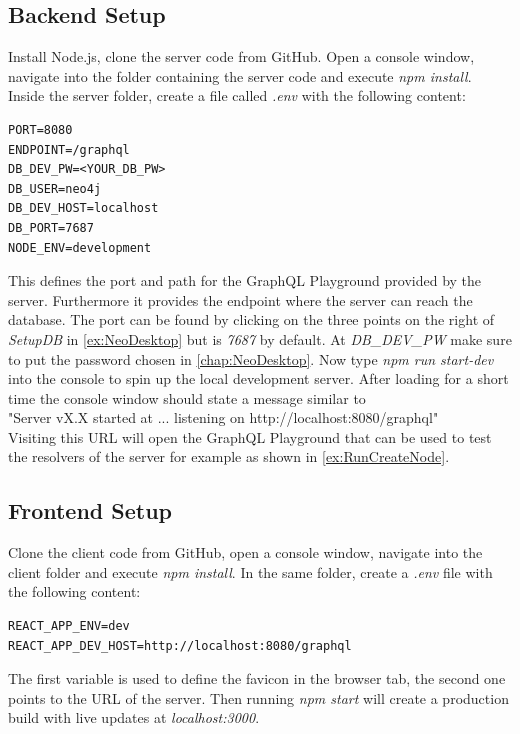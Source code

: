 \subsection{Backend Setup}
Install Node.js, clone the server \cite{GitServer} code from GitHub. Open a console window, navigate into the folder containing the server code and execute \emph{npm install}. Inside the server folder, create a file called \emph{.env} with the following content:
\lstset{language=Docker}
\begin{lstlisting}[caption={Environment Variables for the Server}]
PORT=8080
ENDPOINT=/graphql
DB_DEV_PW=<YOUR_DB_PW>
DB_USER=neo4j
DB_DEV_HOST=localhost
DB_PORT=7687
NODE_ENV=development
\end{lstlisting}
This defines the port and path for the GraphQL Playground provided by the server. Furthermore it provides the endpoint where the server can reach the database. The port can be found by clicking on the three points on the right of \emph{SetupDB} in \autoref{ex:NeoDesktop} but is \emph{7687} by default. At \emph{DB\_DEV\_PW} make sure to put the password chosen in \autoref{chap:NeoDesktop}.
Now type \emph{npm run start-dev} into the console to spin up the local development server. After loading for a short time the console window should state a message similar to \\
"Server vX.X started at ... listening on http://localhost:8080/graphql" \\
Visiting this URL will open the GraphQL Playground that can be used to test the resolvers of the server for example as shown in \autoref{ex:RunCreateNode}.

\subsection{Frontend Setup}
Clone the client \cite{GitClient} code from GitHub, open a console window, navigate into the client folder and execute \emph{npm install}. In the same folder, create a \emph{.env} file with the following content:
\begin{lstlisting}[caption={Environment Variables for the Frontend}]
REACT_APP_ENV=dev
REACT_APP_DEV_HOST=http://localhost:8080/graphql
\end{lstlisting}
The first variable is used to define the favicon in the browser tab, the second one points to the URL of the server. Then running \emph{npm start} will create a production build with live updates at \emph{localhost:3000}.

